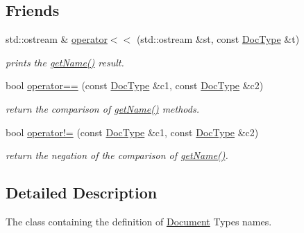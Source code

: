 \subsection*{Friends}
\begin{DoxyCompactItemize}
\item 
\hypertarget{classdocs_1_1DocType_ab7f2e778c65c36835a714e77aa2c3a09}{std\-::ostream \& \hyperlink{classdocs_1_1DocType_ab7f2e778c65c36835a714e77aa2c3a09}{operator$<$$<$} (std\-::ostream \&st, const \hyperlink{classdocs_1_1DocType}{Doc\-Type} \&t)}\label{classdocs_1_1DocType_ab7f2e778c65c36835a714e77aa2c3a09}

\begin{DoxyCompactList}\small\item\em prints the \hyperlink{classdocs_1_1DocType_a4632fc57ed71ebb984aa8dd78017db03}{get\-Name()} result. \end{DoxyCompactList}\item 
\hypertarget{classdocs_1_1DocType_aa68c01dc0d9b0494723b223bf52a6acf}{bool \hyperlink{classdocs_1_1DocType_aa68c01dc0d9b0494723b223bf52a6acf}{operator==} (const \hyperlink{classdocs_1_1DocType}{Doc\-Type} \&c1, const \hyperlink{classdocs_1_1DocType}{Doc\-Type} \&c2)}\label{classdocs_1_1DocType_aa68c01dc0d9b0494723b223bf52a6acf}

\begin{DoxyCompactList}\small\item\em return the comparison of \hyperlink{classdocs_1_1DocType_a4632fc57ed71ebb984aa8dd78017db03}{get\-Name()} methods. \end{DoxyCompactList}\item 
\hypertarget{classdocs_1_1DocType_a6f7b8c51d3dc0ec95808119766eb8010}{bool \hyperlink{classdocs_1_1DocType_a6f7b8c51d3dc0ec95808119766eb8010}{operator!=} (const \hyperlink{classdocs_1_1DocType}{Doc\-Type} \&c1, const \hyperlink{classdocs_1_1DocType}{Doc\-Type} \&c2)}\label{classdocs_1_1DocType_a6f7b8c51d3dc0ec95808119766eb8010}

\begin{DoxyCompactList}\small\item\em return the negation of the comparison of \hyperlink{classdocs_1_1DocType_a4632fc57ed71ebb984aa8dd78017db03}{get\-Name()}. \end{DoxyCompactList}\end{DoxyCompactItemize}


\subsection{Detailed Description}
The class containing the definition of \hyperlink{classdocs_1_1Document}{Document} Types names. 

